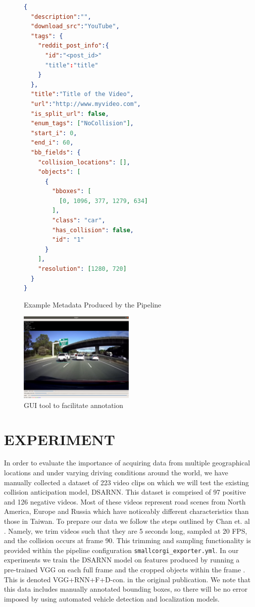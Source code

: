 \documentclass[letterpaper, 10 pt, conference]{IEEEconf}
\begin{document}
\begin{figure}
  \begin{lstlisting}[language=json]
{
  "description":"",
  "download_src":"YouTube",
  "tags": {
    "reddit_post_info":{
      "id":"<post_id>"
      "title":"title"
    }
  },
  "title":"Title of the Video",
  "url":"http://www.myvideo.com",
  "is_split_url": false,
  "enum_tags": ["NoCollision"],
  "start_i": 0,
  "end_i": 60,
  "bb_fields": {
    "collision_locations": [],
    "objects": [
      {
        "bboxes": [
          [0, 1096, 377, 1279, 634]
        ],
        "class": "car",
        "has_collision": false,
        "id": "1"
      }
    ],
    "resolution": [1280, 720]
  }
}
  \end{lstlisting}
    \caption{Example Metadata Produced by the Pipeline}
    \label{metadata_example}
\end{figure}

\begin{figure}[htpb]
		\centering
    \includegraphics[width=0.5\textwidth]{example_gui_tool.png}
		\caption{GUI tool to facilitate annotation}
		\label{fig:example_gui_tool-png}
\end{figure}

\section{EXPERIMENT}

In order to evaluate the importance of acquiring data from multiple geographical locations and under varying driving conditions around the world, we have manually collected a dataset of 223 video clips on which we will test the existing collision anticipation model, DSARNN. This dataset is comprised of 97 positive and 126 negative videos. Most of these videos represent road scenes from North America, Europe and Russia which have noticeably different characteristics than those in Taiwan. To prepare our data we follow the steps outlined by Chan et. al \cite{chan2016anticipating}. Namely, we trim videos such that they are 5 seconds long, sampled at 20 FPS, and the collision occurs at frame 90. This trimming and sampling functionality is provided within the pipeline configuration \texttt{smallcorgi\_exporter.yml}. In our experiments we train the DSARNN model on features produced by running a pre-trained VGG on each full frame and the cropped objects within the frame \cite{DBLP:journals/corr/SimonyanZ14a}. This is denoted VGG+RNN+F+D-con. in the original publication. We note that this data includes manually annotated bounding boxes, so there will be no error imposed by using automated vehicle detection and localization models.
\end{document}

